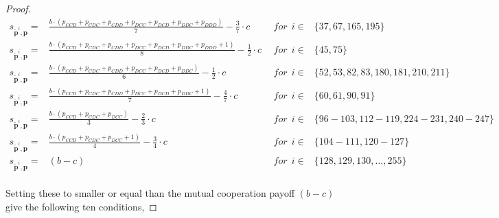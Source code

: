 \documentclass[11pt]{article}
\theoremstyle{plainCl1}
\theoremstyle{plainCl2}
\begin{document}
\begin{proof}
{\begin{equation}
\begin{array}{lcll}
    s_{\mathbf{\tilde{p}}^{i}, \mathbf{p}} = & \frac{b \cdot \left(p_{CCD} + p_{CDC} + p_{CDD} + p_{DCC} + p_{DCD} + p_{DDC} + p_{DDD}\right)}{7}  - \frac{3}{7} \cdot c& ~~for~~ i \in & \{ 37, 67, 165, 195\} \\ [0.2cm]
    s_{\mathbf{\tilde{p}}^{i}, \mathbf{p}} = & \frac{b \cdot \left(p_{CCD} + p_{CDC} + p_{CDD} + p_{DCC} + p_{DCD} + p_{DDC} + p_{DDD} + 1\right)}{8} - \frac{1}{2} \cdot c & ~~for~~ i \in & \{ 45, 75\} \\ [0.2cm]
    s_{\mathbf{\tilde{p}}^{i}, \mathbf{p}} = & \frac{b \cdot \left(p_{CCD} + p_{CDC} + p_{CDD} + p_{DCC} + p_{DCD} + p_{DDC}\right)}{6} - \frac{1}{2} \cdot c & ~~for~~ i \in & \{ 52, 53, 82, 83, 180, 181, 210, 211\} \\  [0.2cm]
    s_{\mathbf{\tilde{p}}^{i}, \mathbf{p}} = & \frac{b \cdot \left(p_{CCD} + p_{CDC} + p_{CDD} + p_{DCC} + p_{DCD} + p_{DDC} + 1\right)}{7} - \frac{4}{7} \cdot c & ~~for~~ i \in & \{ 60, 61, 90, 91\} \\ [0.2cm]
    s_{\mathbf{\tilde{p}}^{i}, \mathbf{p}} = & \frac{b \cdot \left(p_{CCD} + p_{CDC} + p_{DCC}\right)}{3} - \frac{2}{3} \cdot c & ~~for~~ i \in & \{ 96\!- \!103, 112\!- \!119, 224\!- \!231, 240\!- \!247\} \\ [0.2cm]
    s_{\mathbf{\tilde{p}}^{i}, \mathbf{p}} = & \frac{b \cdot \left(p_{CCD} + p_{CDC} + p_{DCC} + 1\right)}{4} - \frac{3}{4} \cdot c & ~~for~~ i \in & \{ 104\!-\!111, 120\!- \!127\} \\ [0.2cm]
    s_{\mathbf{\tilde{p}}^{i}, \mathbf{p}} = & (b - c) & ~~for~~ i \in & \{128, 129, 130, \dots, 255\} \\
\end{array}
\end{equation}}

Setting these to smaller or equal than the mutual cooperation payoff $(b - c)$
give the following ten conditions,


\end{proof}
\end{document}

